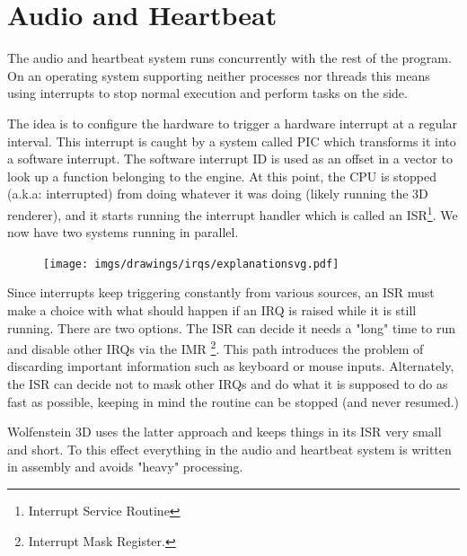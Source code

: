 \section{Audio and Heartbeat}
The audio and heartbeat system runs concurrently with the rest of the program. On an operating system supporting neither processes nor threads this means using interrupts to stop normal execution and perform tasks on the side.\\
\par
The idea is to configure the hardware to trigger a hardware interrupt at a regular interval. This interrupt is caught by a system called PIC which transforms it into a software interrupt. The software interrupt ID is used as an offset in a vector to look up a function belonging to the engine. At this point, the CPU is stopped (a.k.a: interrupted) from doing whatever it was doing (likely running the 3D renderer), and it starts running the interrupt handler which is called an ISR\footnote{Interrupt Service Routine}. We now have two systems running in parallel.\\
\par
\begin{figure}[H]
\centering
\texttt{[image: imgs/drawings/irqs/explanationsvg.pdf]}
 \end{figure}
\par
\par
 Since interrupts keep triggering constantly from various sources, an ISR must make a choice with what should happen if an IRQ is raised while it is still running. There are two options.  The ISR can decide it needs a "long" time to run and disable other IRQs via the IMR \footnote{Interrupt Mask Register.}. This path introduces the problem of discarding important information such as keyboard or mouse inputs. Alternately, the ISR can decide not to mask other IRQs and do what it is supposed to do as fast as possible, keeping in mind the routine can be stopped (and never resumed.)\\
 \par
 Wolfenstein 3D uses the latter approach and keeps things in its ISR very small and short. To this effect everything in the audio and heartbeat system is written in assembly and avoids "heavy" processing.

